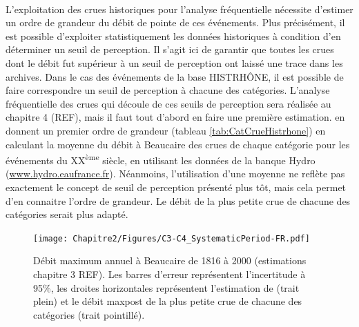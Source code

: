 	\paragraph{} L'exploitation des crues historiques pour l'analyse fréquentielle nécessite d'estimer un ordre de grandeur du débit de pointe de ces événements. Plus précisément, il est possible d'exploiter statistiquement les données historiques à condition d'en déterminer un seuil de perception. Il s'agit ici de garantir que toutes les crues dont le débit fut supérieur à un seuil de perception ont laissé une trace dans les archives. Dans le cas des événements de la base HISTRHÔNE, il est possible de faire correspondre un seuil de perception à chacune des catégories. L'analyse fréquentielle des crues qui découle de ces seuils de perception sera réalisée au chapitre 4 (REF), mais il faut tout d'abord en faire une première estimation. \citet{pichard_hydro-climatology_2017} en donnent un premier ordre de grandeur (tableau \ref{tab:CatCrueHistrhone}) en calculant la moyenne du débit à Beaucaire des crues de chaque catégorie pour les événements du XX\textsuperscript{ème} siècle, en utilisant les données de la banque Hydro (\url{www.hydro.eaufrance.fr}). Néanmoins, l'utilisation d'une moyenne ne reflète pas exactement le concept de seuil de perception présenté plus tôt, mais cela permet d'en connaitre l'ordre de grandeur. Le débit de la plus petite crue de chacune des catégories serait plus adapté. 
	
	\begin{figure}[h]
	\centering
		\texttt{[image: Chapitre2/Figures/C3-C4\_SystematicPeriod-FR.pdf]}
        \caption{Débit maximum annuel à Beaucaire de 1816 à 2000 (estimations chapitre 3 REF). Les barres d'erreur représentent l'incertitude à 95\%, les droites horizontales représentent l'estimation de \citet{pichard_hydro-climatology_2017} (trait plein) et le débit maxpost de la plus petite crue de chacune des catégories (trait pointillé).}
		\label{fig:C3-C4_Syst}
	\end{figure}
		
	
